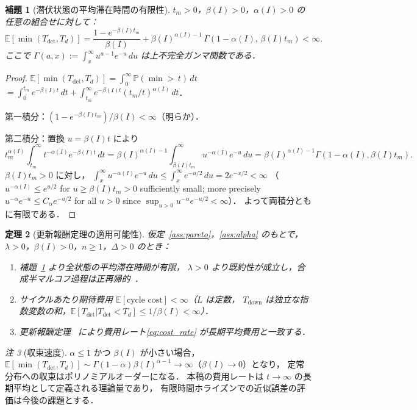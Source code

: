 \documentclass[12pt,a4paper]{article}
\theoremstyle{plain}
\newtheorem{theorem}{定理}[section]
\newtheorem{lemma}[theorem]{補題}
\theoremstyle{definition}
\theoremstyle{remark}
\newtheorem{remark}[theorem]{注}
\newcommand{\E}{\mathbb{E}}
\newcommand{\Prob}{\mathbb{P}}
\newcommand{\Tdet}{T_{\mathrm{det}}}
\newcommand{\Tdown}{T_{\mathrm{down}}}
\newcommand{\betaI}{\beta(I)}
\newcommand{\alphI}{\alpha(I)}
\begin{document}
\begin{lemma}[潜伏状態の平均滞在時間の有限性]\label{lem:sojourn_finite}
$t_m>0$，$\betaI>0$，$\alphI>0$ の任意の組合せに対して：
\begin{equation}\label{eq:E_min}
\E[\min(\Tdet,T_d)]
=\frac{1-e^{-\betaI t_m}}{\betaI}
+\betaI^{\alphI-1}\,\Gamma(1-\alphI,\,\betaI t_m)
<\infty.
\end{equation}
ここで $\Gamma(a,x):=\int_x^\infty u^{a-1}e^{-u}\,du$ は上不完全ガンマ関数である．
\end{lemma}

\begin{proof}
$\E[\min(\Tdet,T_d)]=\int_0^\infty\Prob(\min>\,t)\,dt$
$=\int_0^{t_m}e^{-\betaI t}\,dt+\int_{t_m}^\infty e^{-\betaI t}(t_m/t)^{\alphI}\,dt$．

第一積分：$(1-e^{-\betaI t_m})/\betaI<\infty$（明らか）．

第二積分：置換 $u=\betaI t$ により
\[
t_m^{\alphI}\int_{t_m}^\infty t^{-\alphI}e^{-\betaI t}\,dt
= \betaI^{\alphI-1}\int_{\betaI t_m}^\infty u^{-\alphI}e^{-u}\,du
= \betaI^{\alphI-1}\Gamma(1-\alphI,\betaI t_m).
\]
$\betaI t_m>0$ に対し，
$\int_x^\infty u^{-\alphI}e^{-u}\,du\le\int_x^\infty e^{-u/2}\,du=2e^{-x/2}<\infty$
（$u^{-\alphI}\le e^{u/2}$ for $u\ge\betaI t_m>0$ sufficiently small; more precisely
$u^{-\alpha}e^{-u}\le C_\alpha e^{-u/2}$ for all $u>0$ since $\sup_{u>0}u^{-\alpha}e^{-u/2}<\infty$）．
よって両積分ともに有限である．
\end{proof}

\begin{theorem}[更新報酬定理の適用可能性]\label{thm:renewal}
仮定~\ref{ass:pareto}，\ref{ass:alpha} のもとで，
$\lambda>0$，$\betaI>0$，$n\ge1$，$\Delta>0$ のとき：
\begin{enumerate}[label=(\roman*)]
\item 補題~\ref{lem:sojourn_finite} より全状態の平均滞在時間が有限，
  $\lambda>0$ より既約性が成立し，合成半マルコフ過程は正再帰的~\cite{limnios2001}．
\item サイクルあたり期待費用 $\E[\text{cycle cost}]<\infty$（$L$ は定数，
  $\Tdown$ は独立な指数変数の和，$\E[\Tdet|\Tdet<T_d]\le1/\betaI<\infty$）．
\item 更新報酬定理~\cite{ross2014} により費用レート\eqref{eq:cost_rate} が長期平均費用と一致する．
\end{enumerate}
\end{theorem}

\begin{remark}[収束速度]
$\alpha\le1$ かつ $\betaI$ が小さい場合，
$\E[\min(\Tdet,T_d)]\sim\Gamma(1-\alpha)\betaI^{\alpha-1}\to\infty$（$\betaI\to0$）となり，
定常分布への収束はポリノミアルオーダーになる．
本稿の費用レートは $t\to\infty$ の長期平均として定義される理論量であり，
有限時間ホライズンでの近似誤差の評価は今後の課題とする．
\end{remark}
\end{document}
